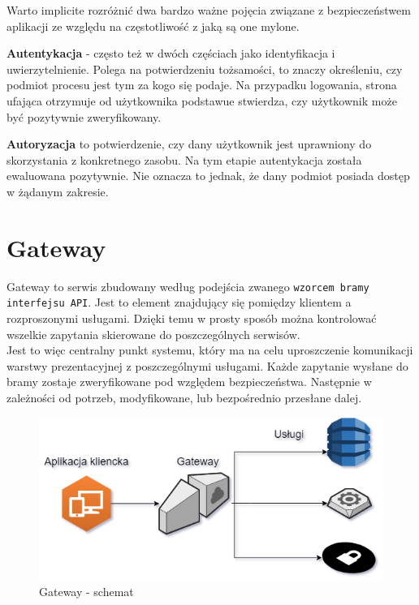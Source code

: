 Warto implicite rozróżnić dwa bardzo ważne pojęcia związane z bezpieczeństwem aplikacji ze względu na częstotliwość z jaką są one mylone.

\textbf{Autentykacja} - często też w dwóch częściach jako identyfikacja i uwierzytelnienie. Polega na potwierdzeniu tożsamości, to znaczy określeniu, czy podmiot procesu jest tym za kogo się podaje. Na przypadku logowania, strona ufająca otrzymuje od użytkownika podstawue stwierdza, czy użytkownik może być pozytywnie zweryfikowany.

\textbf{Autoryzacja} to potwierdzenie, czy dany użytkownik jest uprawniony do skorzystania z konkretnego zasobu. Na tym etapie autentykacja została ewaluowana pozytywnie. Nie oznacza to jednak, że dany podmiot posiada dostęp w żądanym zakresie. 


\section{Gateway}
Gateway to serwis zbudowany według podejścia zwanego \texttt{wzorcem bramy interfejsu API}\cite{api_gateway}. Jest to element znajdujący się pomiędzy klientem a rozproszonymi usługami. Dzięki temu w prosty sposób można kontrolować wszelkie zapytania skierowane do poszczególnych serwisów.\\
Jest to więc centralny punkt systemu, który ma na celu uproszczenie komunikacji warstwy prezentacyjnej z poszczególnymi usługami. Każde zapytanie wysłane do bramy zostaje zweryfikowane pod względem bezpieczeństwa. Następnie w zależności od potrzeb, modyfikowane, lub bezpośrednio przesłane dalej.
\begin{figure}[H]
	\centering
	\includegraphics[width=\linewidth]{gateway.png}
	\caption{Gateway - schemat}
\end{figure}

